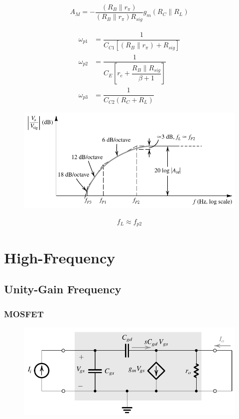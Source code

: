 \begin{equation*}
  \begin{aligned}
    A_M = - \dfrac{\left( R_B \parallel r_{\pi} \right)}{\left( R_B \parallel r_{\pi} \right) R_{sig} } g_m \left( R_C \parallel R_L \right) 
  \end{aligned}
\end{equation*}

\begin{equation*}
  \begin{aligned}
    \omega_{p1} &= \dfrac{1}{C_{C1} \left[ \left( R_B \parallel r_{\pi} \right) + R_{sig} \right]} \\
    \omega_{p2} &= \dfrac{1}{C_E \left[ r_e + \dfrac{R_B \parallel R_{sig}}{\beta + 1}  \right]} \\
    \omega_{p3} &= \dfrac{1}{C_{C2} \left( R_C + R_L \right)} 
  \end{aligned}
\end{equation*}

\begin{figure}[H]
  \centering
  \includegraphics[width=0.5\linewidth]{figures/Frequency-Response-CE-freq}
  \label{fig:}
\end{figure}

\begin{equation*}
  \begin{aligned}
    f_L \approx f_{p2}
  \end{aligned}
\end{equation*}

\section{High-Frequency}

\subsection{Unity-Gain Frequency}

\subsubsection{MOSFET}

\begin{figure}[H]
  \centering
  \includegraphics[width=0.5\linewidth]{figures/Frequency-Response-UG-MOS}
  \label{fig:}
\end{figure}

